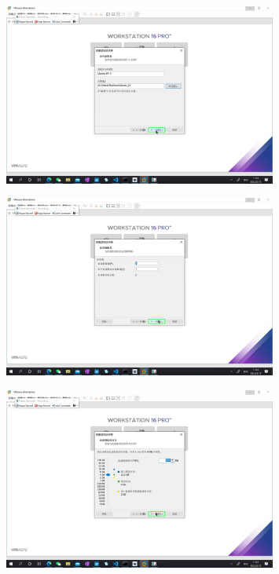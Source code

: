 \documentclass[UTF8]{ctexart}
\begin{document}
    \begin{figure}[H]
        \centering
        \includegraphics[width=0.8\textwidth]{assets/u8.png}
    \end{figure}
    \begin{figure}[H]
        \centering
        \includegraphics[width=0.8\textwidth]{assets/u9.png}
    \end{figure}
    \begin{figure}[H]
        \centering
        \includegraphics[width=0.8\textwidth]{assets/u11.png}
    \end{figure}
\end{document}
